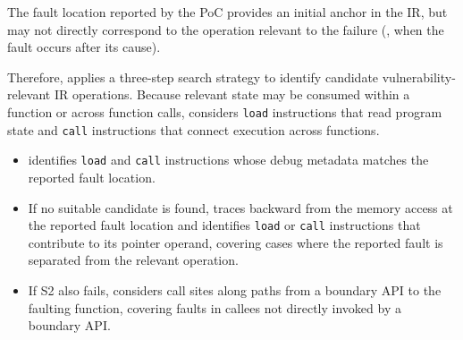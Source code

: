 The fault location reported by the PoC provides an initial anchor in the IR, but may not directly correspond to the operation relevant to the failure (\eg, when the fault occurs after its cause).

Therefore, \sys applies a three-step search strategy to identify candidate vulnerability-relevant IR operations.
Because relevant state may be consumed within a function or across
function calls, \sys considers \texttt{load} instructions that read
program state and \texttt{call} instructions that connect execution
across functions.

%
\begin{itemize}
    \setlength\itemsep{0.0em}
    \item[\textbf{S1.}] 
    \sys identifies \texttt{load} and \texttt{call} instructions
    whose debug metadata matches the reported fault location.

    \item[\textbf{S2.}] If no suitable candidate is found, \sys traces backward from the memory access at the reported fault location and identifies \texttt{load} or \texttt{call} instructions that contribute to its pointer operand, covering cases where the reported fault is separated from the relevant operation.

    \item[\textbf{S3.}] If S2 also fails, \sys considers call sites along paths from a boundary API to the faulting function, covering faults in callees not directly invoked by a boundary API.

\end{itemize}




